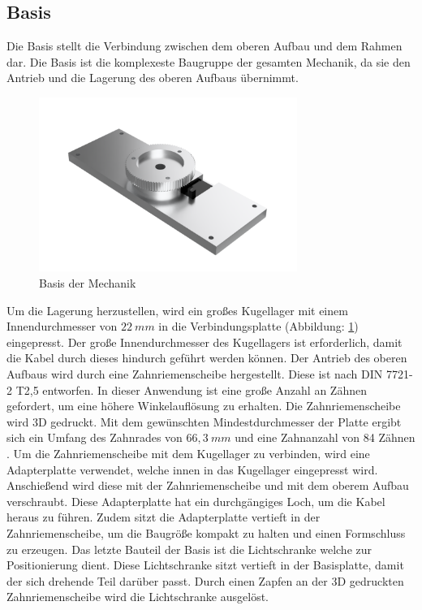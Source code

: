 \subsection{Basis}
Die Basis stellt die Verbindung zwischen dem oberen Aufbau und dem Rahmen dar. Die Basis ist die komplexeste Baugruppe der gesamten Mechanik, da sie den Antrieb und die Lagerung des oberen Aufbaus übernimmt. 
\begin{figure}[H]
	\centering
	\includegraphics[width=0.75\textwidth]{images/Mechanik/Basis}
	\caption{Basis der Mechanik}
	\label{basis}
\end{figure}
Um die Lagerung herzustellen, wird ein großes Kugellager mit einem Innendurchmesser von $22\:mm$ in die Verbindungsplatte (Abbildung: \ref{basis}) eingepresst. Der große Innendurchmesser des Kugellagers ist erforderlich, damit die Kabel durch dieses hindurch geführt werden können. Der Antrieb des oberen Aufbaus wird durch eine Zahnriemenscheibe hergestellt. Diese ist nach DIN 7721-2 T2,5 \cite{Tabellenbuch} entworfen. In dieser Anwendung ist eine große Anzahl an Zähnen gefordert, um eine höhere Winkelauflösung zu erhalten. Die Zahnriemenscheibe wird 3D gedruckt. Mit dem gewünschten Mindestdurchmesser der Platte ergibt sich ein Umfang des Zahnrades von $66,3\:mm$ und eine Zahnanzahl von 84 Zähnen \cite{Tabellenbuch}. Um die Zahnriemenscheibe mit dem Kugellager zu verbinden, wird eine Adapterplatte verwendet, welche innen in das Kugellager eingepresst wird. Anschießend wird diese mit der Zahnriemenscheibe und mit dem oberem Aufbau verschraubt. Diese Adapterplatte hat ein durchgängiges Loch, um die Kabel heraus zu führen. Zudem sitzt die Adapterplatte vertieft in der Zahnriemenscheibe, um die Baugröße kompakt zu halten und einen Formschluss zu erzeugen. Das letzte Bauteil der Basis ist die Lichtschranke welche zur Positionierung dient. Diese Lichtschranke sitzt vertieft in der Basisplatte, damit der sich drehende Teil darüber passt. Durch einen Zapfen an der 3D gedruckten Zahnriemenscheibe wird die Lichtschranke ausgelöst. 
